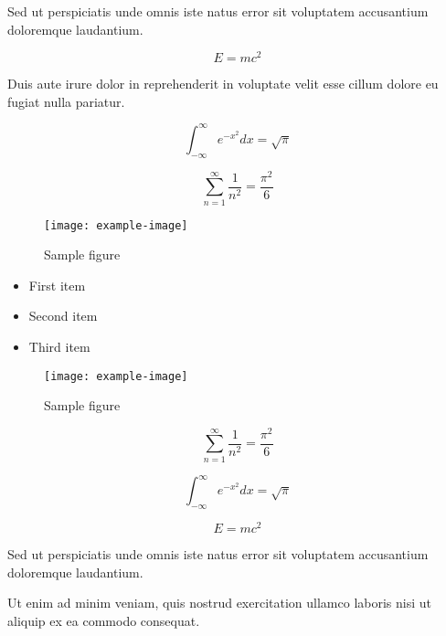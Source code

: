 \documentclass{article}
\begin{document}
Sed ut perspiciatis unde omnis iste natus error sit voluptatem accusantium doloremque laudantium.


\begin{equation}
    E = mc^2
\end{equation}

Duis aute irure dolor in reprehenderit in voluptate velit esse cillum dolore eu fugiat nulla pariatur.

\begin{equation}
    \int_{-\infty}^{\infty} e^{-x^2} dx = \sqrt{\pi}
\end{equation}

\begin{equation}
    \sum_{n=1}^{\infty} \frac{1}{n^2} = \frac{\pi^2}{6}
\end{equation}


\begin{figure}[h]
    \centering
    \texttt{[image: example-image]}
    \caption{Sample figure}
    \label{fig:sample}
\end{figure}


\begin{itemize}
\item First item
\item Second item
\item Third item
\end{itemize}

\begin{figure}[h]
    \centering
    \texttt{[image: example-image]}
    \caption{Sample figure}
    \label{fig:sample}
\end{figure}

\begin{equation}
    \sum_{n=1}^{\infty} \frac{1}{n^2} = \frac{\pi^2}{6}
\end{equation}


\begin{equation}
    \int_{-\infty}^{\infty} e^{-x^2} dx = \sqrt{\pi}
\end{equation}

\begin{equation}
    E = mc^2
\end{equation}

Sed ut perspiciatis unde omnis iste natus error sit voluptatem accusantium doloremque laudantium.

Ut enim ad minim veniam, quis nostrud exercitation ullamco laboris nisi ut aliquip ex ea commodo consequat.
\end{document}
